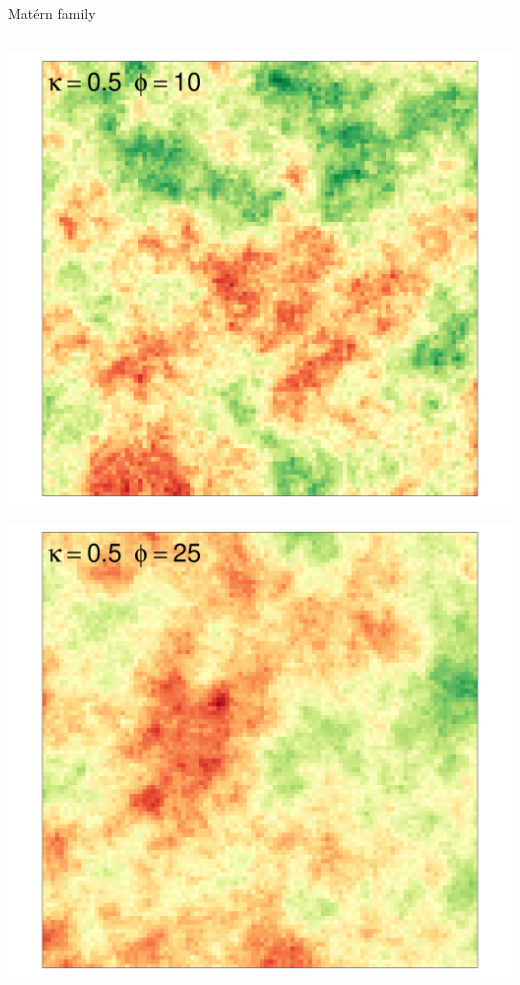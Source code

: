 \documentclass[
  ignorenonframetext,
]{beamer}
\begin{document}
\begin{frame}{Matérn family}
\begin{columns}[T]
\begin{column}{0.33\textwidth}
\includegraphics{Lecture_1_files/figure-beamer/unnamed-chunk-28-1.pdf}

\includegraphics{Lecture_1_files/figure-beamer/unnamed-chunk-29-1.pdf}
\end{column}


\end{columns}
\end{frame}
\end{document}
